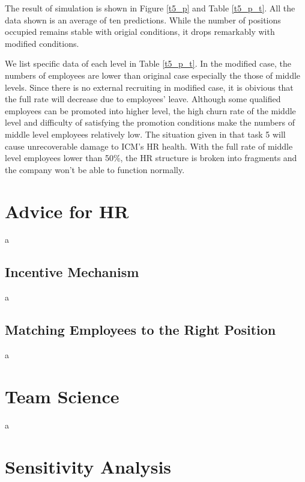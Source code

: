 \documentclass[12pt,a4paper,titlepage]{article}
\begin{document}
The result of simulation is shown in Figure \ref{t5_p} and Table \ref{t5_p_t}. All the data shown is an average of ten predictions. While the number of positions occupied remains stable with origial conditions, it drops remarkably with modified conditions.

We list specific data of each level in Table \ref{t5_p_t}. In the modified case, the numbers of employees are lower than original case especially the those of middle levels. Since there is no external recruiting in modified case, it is obivious that the full rate will decrease due to employees' leave. Although some qualified employees can be promoted into higher level, the high churn rate of the middle level and difficulty of satisfying the promotion conditions make the numbers of middle level employees relatively low. The situation given in that task 5 will cause unrecoverable damage to ICM's HR health. With the full rate of middle level employees lower than 50\%, the HR structure is broken into fragments and the company won't be able to function normally.


\section{Advice for HR}
\label{sec:advice-for-hr}

a

\subsection{Incentive Mechanism}
\label{sec:incentive-machanism}

a

\subsection{Matching Employees to the Right Position}
\label{sec:matching-employees-to-the-right-position}

a

\section{Team Science}
\label{sec:team-science}

a

\section{Sensitivity Analysis}
\label{sec:sensitivity-analysis}
\end{document}
